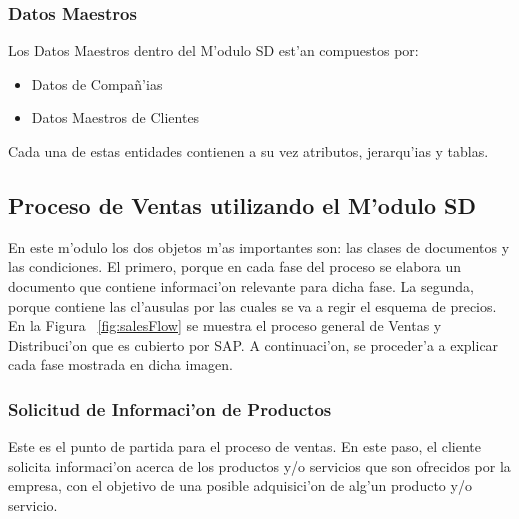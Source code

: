 \subsubsection*{Datos Maestros}
Los Datos Maestros dentro del M'odulo SD est'an compuestos por:
\begin{itemize}
\item Datos de Compa\~n'ias
\item Datos Maestros de Clientes
\end{itemize}
Cada una de estas entidades contienen a su vez atributos, jerarqu'ias y tablas.

\subsection{Proceso de Ventas utilizando el M'odulo SD}
	En este m'odulo los dos objetos m'as importantes son: las clases de documentos y las condiciones. El primero, porque en cada fase del proceso se elabora un documento que contiene informaci'on relevante para dicha fase. La segunda, porque contiene las cl'ausulas por las cuales se va a regir el esquema de precios.
	En la Figura ~\ref{fig:salesFlow} se muestra el proceso general de Ventas y Distribuci'on que es cubierto por SAP. A continuaci'on, se proceder'a a explicar cada fase mostrada en dicha imagen.

\subsubsection*{Solicitud de Informaci'on de Productos}
	Este es el punto de partida para el proceso de ventas. En este paso, el cliente solicita informaci'on acerca de los productos y/o servicios que son ofrecidos por la empresa, con el objetivo de una posible adquisici'on de alg'un producto y/o servicio.
	
